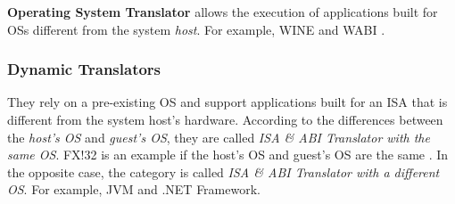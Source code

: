	\textbf{Operating System Translator} allows the execution of applications built for OSs different from the system \textit{host}. For example, WINE \cite{Wine} and WABI \cite{WABI}.
		
	\subsubsection {Dynamic Translators}
	
	They rely on a pre-existing OS and support applications built for an ISA that is different from the system host's hardware. According to the differences between the \textit{host's OS} and \textit{guest's OS}, they are called \textit{ISA \& ABI Translator with the same OS}. FX!32 is an example if the host's OS and guest's OS are the same \cite{Chernoff1998}. In the opposite case, the category is called \textit{ISA \& ABI Translator with a different OS}. For example, JVM and .NET Framework.
	
